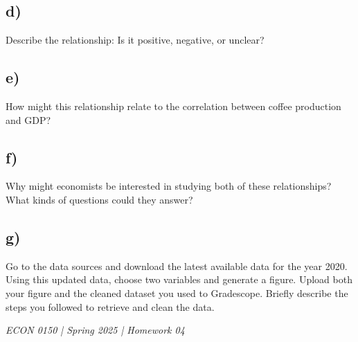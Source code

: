 \documentclass[12pt]{article}
\begin{document}
\subsection*{d)} Describe the relationship: Is it positive, negative, or unclear?

\subsection*{e)} How might this relationship relate to the correlation between coffee production and GDP?

\subsection*{f)} Why might economists be interested in studying both of these relationships? What kinds of questions could they answer?

\subsection*{g)} Go to the data sources and download the latest available data for the year 2020. Using this updated data, choose two variables and generate a figure. Upload both your figure and the cleaned dataset you used to Gradescope. Briefly describe the steps you followed to retrieve and clean the data.


\vfill

\noindent\hrulefill

\noindent \small{\textit{ECON 0150 | Spring 2025 | Homework 04}} \\
\textit{}
\end{document}
